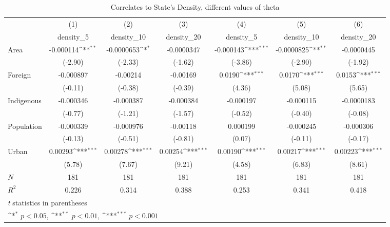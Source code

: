 \begin{table}[htbp]\centering
\def\sym#1{\ifmmode^{#1}\else\(^{#1}\)\fi}
\caption{Correlates to State's Density, different values of theta}
\begin{tabular}{l*{6}{c}}
\hline\hline
          &\multicolumn{1}{c}{(1)}&\multicolumn{1}{c}{(2)}&\multicolumn{1}{c}{(3)}&\multicolumn{1}{c}{(4)}&\multicolumn{1}{c}{(5)}&\multicolumn{1}{c}{(6)}\\
          &\multicolumn{1}{c}{density\_5}&\multicolumn{1}{c}{density\_10}&\multicolumn{1}{c}{density\_20}&\multicolumn{1}{c}{density\_5}&\multicolumn{1}{c}{density\_10}&\multicolumn{1}{c}{density\_20}\\
\hline
Area      &-0.000114\sym{**} &-0.0000653\sym{*}  &-0.0000347         &-0.000143\sym{***}&-0.0000825\sym{**} &-0.0000445         \\
          &  (-2.90)         &  (-2.33)         &  (-1.62)         &  (-3.86)         &  (-2.90)         &  (-1.92)         \\
[1em]
Foreign   &-0.000897         & -0.00214         & -0.00169         &   0.0190\sym{***}&   0.0170\sym{***}&   0.0153\sym{***}\\
          &  (-0.11)         &  (-0.38)         &  (-0.39)         &   (4.36)         &   (5.08)         &   (5.65)         \\
[1em]
Indigenous&-0.000346         &-0.000387         &-0.000384         &-0.000197         &-0.000115         &-0.0000183         \\
          &  (-0.77)         &  (-1.21)         &  (-1.57)         &  (-0.52)         &  (-0.40)         &  (-0.08)         \\
[1em]
Population&-0.000339         &-0.000976         & -0.00118         & 0.000199         &-0.000245         &-0.000306         \\
          &  (-0.13)         &  (-0.51)         &  (-0.81)         &   (0.07)         &  (-0.11)         &  (-0.17)         \\
[1em]
Urban     &  0.00293\sym{***}&  0.00278\sym{***}&  0.00254\sym{***}&  0.00190\sym{***}&  0.00217\sym{***}&  0.00223\sym{***}\\
          &   (5.78)         &   (7.67)         &   (9.21)         &   (4.58)         &   (6.83)         &   (8.61)         \\
\hline
\(N\)     &      181         &      181         &      181         &      181         &      181         &      181         \\
\(R^{2}\) &    0.226         &    0.314         &    0.388         &    0.253         &    0.341         &    0.418         \\
\hline\hline
\multicolumn{7}{l}{\footnotesize \textit{t} statistics in parentheses}\\
\multicolumn{7}{l}{\footnotesize \sym{*} \(p<0.05\), \sym{**} \(p<0.01\), \sym{***} \(p<0.001\)}\\
\end{tabular}
\end{table}
